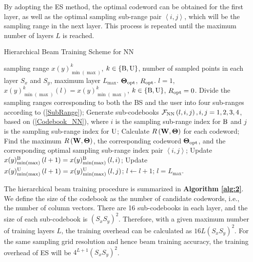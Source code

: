 \documentclass[lettersize, journal]{IEEEtran}
\begin{document}
By adopting the ES method, the optimal codeword can be obtained for the first layer, as well as the optimal sampling sub-range pair $ \left \langle i, j \right \rangle$, which will be the sampling range in the next layer.
This process is repeated until the maximum number of layers $L$ is reached.


\begin{algorithm}[!t]
\caption{ Hierarchical Beam Training Scheme for NN }
\label{alg:2}
\begin{algorithmic}[1]
\REQUIRE sampling range $x(y)^{k}_{\min(\max)}$, $ k \in \left\{ {\rm{B}}, {\rm{U}}\right\} $, number of sampled points in each layer $S_x $ and $S_y $, maximum layer $L_{\max}$.
\ENSURE ${\bf{\Theta }}_{\rm{opt}}$, $R_{\rm{opt}}$.
 $l=1$, $x(y)^{k}_{\min(\max)}\left( l \right) = x(y)^{k}_{\min(\max)}$, $ k \in \left\{ {\rm{B}}, {\rm{U}}\right\} $, $ R_{\rm{opt}} = 0 $.
\REPEAT
\STATE Divide the sampling ranges corresponding to both the BS and the user into four sub-ranges according to (\ref{SubRange});
\STATE Generate sub-codebooks ${\cal{F}}_{\rm{NN}} \left( l, i, j \right), i, j =1,2,3,4$, based on ({\ref{Codebook_NN}}), where $i$ is the sampling sub-range index for ${\rm{B}}$ and $j$ is the sampling sub-range index for ${\rm{U}}$;
\STATE Calculate $R \left( {\bf{W}}, {\bf{\Theta }} \right)$ for each codeword;
\STATE Find the maximum $R \left( {\bf{W}}, {\bf{\Theta }} \right)$, the corresponding codeword ${\bf{\Theta }}_{\rm{opt}}$, and the corresponding optimal sampling sub-range index pair $ \left \langle i, j \right \rangle$;
\STATE Update $x(y)^{\rm{B}}_{\min(\max)}\left( l+1 \right) = x(y)^{\rm{B}}_{\min(\max)} \left( l, i \right)$;
\STATE Update $x(y)^{\rm{U}}_{\min(\max)}\left( l+1 \right) = x(y)^{\rm{U}}_{\min(\max)} \left( l, j \right)$;
\STATE $l \leftarrow l + 1$; 
\UNTIL $l = L_{\max}$.
\end{algorithmic}
\end{algorithm}


The hierarchical beam training procedure is summarized in {\bf{Algorithm {\ref{alg:2}}}}.
We define the size of the codebook as the number of candidate codewords, i.e., the number of column vectors. 
There are 16 sub-codebooks in each layer, and the size of each sub-codebook is $\left( S_x  S_y \right)^2$.
Therefore, with a given maximum number of training layers $L$, the training overhead can be calculated as $16L\left( S_x  S_y \right)^2$.
For the same sampling grid resolution and hence beam training accuracy, the training overhead of ES will be $ 4^{L+1} \left( S_x  S_y \right)^2 $.
\end{document}

